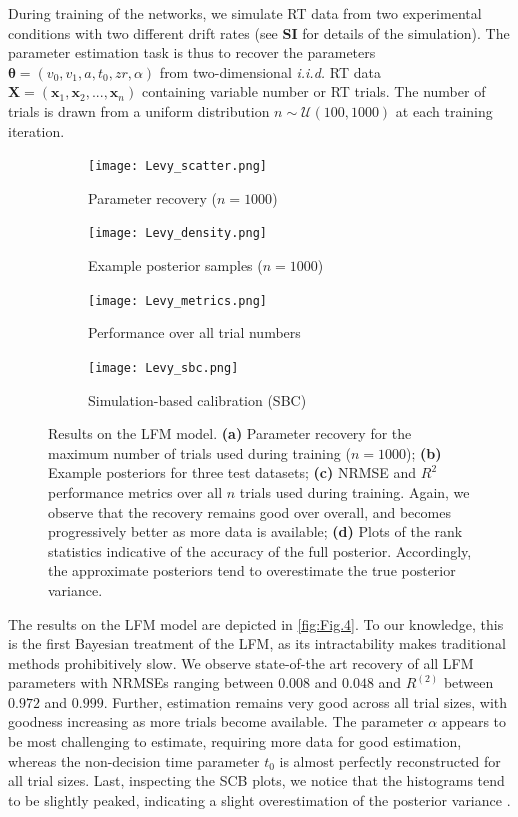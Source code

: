 \documentclass[9pt,twoside,lineno]{pnas-new}
\begin{document}
During training of the networks, we simulate RT data from two experimental conditions with two different drift rates (see \textbf{SI} for details of the simulation). The parameter estimation task is thus to recover the parameters $\boldsymbol{\theta} = (v_{0}, v_{1}, a, t_{0}, zr, \alpha)$ from two-dimensional \textit{i.i.d.} RT data $\boldsymbol{X} = (\boldsymbol{x}_{1},\boldsymbol{x}_{2},...,\boldsymbol{x}_{n})$ containing variable number or RT trials. The number of trials is drawn from a uniform distribution $n \sim \mathcal{U}(100, 1000)$ at each training iteration.
\begin{figure}[H]
\centering
\begin{subfigure}{.49\textwidth}
    \centering
    \texttt{[image: Levy\_scatter.png]}
    \caption{Parameter recovery ($n=1000$)}
    \label{fig:Fig.5a}
\end{subfigure}
\begin{subfigure}{.49\textwidth}
    \centering
    \texttt{[image: Levy\_density.png]}
    \caption{Example posterior samples ($n=1000$)}
    \label{fig:Fig.5b}
\end{subfigure}
\begin{subfigure}{.49\textwidth}
    \centering
    \texttt{[image: Levy\_metrics.png]}
    \caption{Performance over all trial numbers}
    \label{fig:Fig.5c}
\end{subfigure}
\begin{subfigure}{.49\textwidth}
    \centering
    \texttt{[image: Levy\_sbc.png]}
    \caption{Simulation-based calibration (SBC)}
    \label{fig:Fig.5d}
\end{subfigure}
\caption[short]{Results on the LFM model. \textbf{(a)} Parameter recovery for the maximum number of trials used during training ($n=1000$); \textbf{(b)} Example posteriors for three test datasets; \textbf{(c)} NRMSE and $R^{2}$ performance metrics over all $n$ trials used during training. Again, we observe that the recovery remains good over overall, and becomes progressively better as more data is available; \textbf{(d)} Plots of the rank statistics indicative of the accuracy of the full posterior. Accordingly, the approximate posteriors tend to overestimate the true posterior variance.} \label{fig:Fig.5}
\end{figure}

The results on the LFM model are depicted in \autoref{fig:Fig.4}. To our knowledge, this is the first Bayesian treatment of the LFM, as its intractability makes traditional methods prohibitively slow. We observe state-of-the art recovery of all LFM parameters with NRMSEs ranging between $0.008$ and $0.048$ and $R^{(2)}$ between $0.972$ and $0.999$. Further, estimation remains very good across all trial sizes, with goodness increasing as more trials become available. The parameter $\alpha$ appears to be most challenging to estimate, requiring more data for good estimation, whereas the non-decision time parameter $t_{0}$ is almost perfectly reconstructed for all trial sizes. Last, inspecting the SCB plots, we notice that the histograms tend to be slightly peaked, indicating a slight overestimation of the posterior variance \cite{talts2018validating}.
\end{document}
